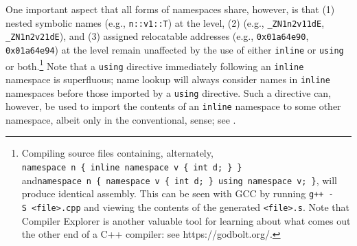 One important aspect that all forms of namespaces share, however, is
that (1) nested symbolic names (e.g., \lstinline!n::v1::T!) at the
 level, (2)  (e.g.,
\lstinline!_ZN1n2v11dE!, \lstinline!_ZN1n2v21dE!), and (3) assigned
relocatable addresses (e.g., \lstinline!0x01a64e90!, \lstinline!0x01a64e94!)
at the  level remain unaffected by the use of either
\lstinline!inline! or \lstinline!using! or both.{\cprotect\footnote{Compiling
source files containing, alternately, 
\lstinline!namespace!~\lstinline!n!~\lstinline!{!~\lstinline!inline!~\lstinline!namespace!~\lstinline!v!~\lstinline!{!~\lstinline!int!~\lstinline!d;!~\lstinline!}!~\lstinline!}! 
and\linebreak[4]%
\lstinline!namespace!~\lstinline!n!~\lstinline!{!~\lstinline!namespace!~\lstinline!v!~\lstinline!{!~\lstinline!int!~\lstinline!d;!~\lstinline!}!~\lstinline!using!~\lstinline!namespace!~\lstinline!v;!~\lstinline!}!, will produce identical assembly. This can be seen with GCC by running \lstinline!g++!~\lstinline!-S!~\lstinline!<file>.cpp! and viewing the contents of the generated \lstinline!<file>.s!. Note that Compiler Explorer is another valuable tool for learning about what comes out the other end of a C++ compiler: see https://godbolt.org/.}} Note that a \lstinline!using! directive immediately following an \lstinline!inline!
namespace is superfluous; name lookup will always consider names in
\lstinline!inline! namespaces before those imported by a \lstinline!using!
directive. Such a directive can, however, be used to import the contents
of an \lstinline!inline! namespace to some other namespace, albeit only in
the conventional,  sense; see . 

